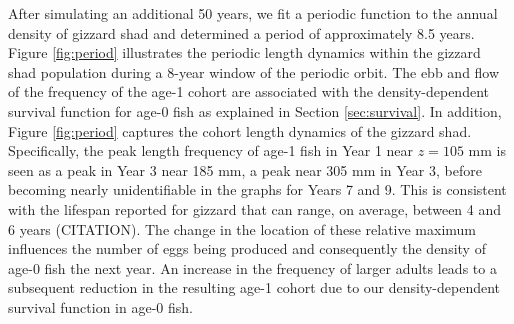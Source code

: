 \documentclass[preprint,review,12pt,authoryear]{elsarticle}
\begin{document}
After simulating an additional 50 years, we fit a periodic function to the annual density of gizzard shad and determined a period of approximately 8.5 years. 
Figure \ref{fig:period} illustrates the periodic length dynamics within the gizzard shad population during a 8-year window of the periodic orbit.  
The ebb and flow of the frequency of the age-1 cohort are associated with the density-dependent survival function for age-0 fish as explained in Section \ref{sec:survival}.
In addition, Figure \ref{fig:period} captures the cohort length dynamics of the gizzard shad. 
Specifically, the peak length frequency of age-1 fish in Year 1 near $z = 105$ mm is seen as a peak in Year 3 near 185 mm, a peak near 305 mm in Year 3, before becoming nearly unidentifiable in the graphs for Years 7 and 9.  
This is consistent with the lifespan reported for gizzard that can range, on average, between 4 and 6 years (CITATION). 
The change in the location of these relative maximum influences the number of eggs being produced and consequently the density of age-0 fish the next year. 
An increase in the frequency of larger adults leads to a subsequent reduction in the resulting age-1 cohort due to our density-dependent survival function in age-0 fish.

%
\end{document}
